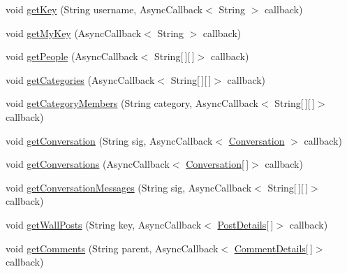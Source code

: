 \begin{DoxyCompactItemize}
\item 
void \hyperlink{interfaceballmerpeak_1_1turtlenet_1_1client_1_1TurtlenetAsync_a24536111eeed3b221288938fe085fc4d}{get\-Key} (String username, Async\-Callback$<$ String $>$ callback)
\item 
void \hyperlink{interfaceballmerpeak_1_1turtlenet_1_1client_1_1TurtlenetAsync_a5b01546855375c628581de60cb818bc1}{get\-My\-Key} (Async\-Callback$<$ String $>$ callback)
\item 
void \hyperlink{interfaceballmerpeak_1_1turtlenet_1_1client_1_1TurtlenetAsync_adb97f522403e5578f780b08e96e8f36b}{get\-People} (Async\-Callback$<$ String\mbox{[}$\,$\mbox{]}\mbox{[}$\,$\mbox{]}$>$ callback)
\item 
void \hyperlink{interfaceballmerpeak_1_1turtlenet_1_1client_1_1TurtlenetAsync_aaefb47d63b1bda3ce692fda9d4ff3b95}{get\-Categories} (Async\-Callback$<$ String\mbox{[}$\,$\mbox{]}\mbox{[}$\,$\mbox{]}$>$ callback)
\item 
void \hyperlink{interfaceballmerpeak_1_1turtlenet_1_1client_1_1TurtlenetAsync_a79c59f68c6b1293bb55ba7f7f07bf83a}{get\-Category\-Members} (String category, Async\-Callback$<$ String\mbox{[}$\,$\mbox{]}\mbox{[}$\,$\mbox{]}$>$ callback)
\item 
void \hyperlink{interfaceballmerpeak_1_1turtlenet_1_1client_1_1TurtlenetAsync_a2e727bd389829fcebaad120ee7900180}{get\-Conversation} (String sig, Async\-Callback$<$ \hyperlink{classballmerpeak_1_1turtlenet_1_1shared_1_1Conversation}{Conversation} $>$ callback)
\item 
void \hyperlink{interfaceballmerpeak_1_1turtlenet_1_1client_1_1TurtlenetAsync_a90857a2008d7e5029c53234d13a3eb29}{get\-Conversations} (Async\-Callback$<$ \hyperlink{classballmerpeak_1_1turtlenet_1_1shared_1_1Conversation}{Conversation}\mbox{[}$\,$\mbox{]}$>$ callback)
\item 
void \hyperlink{interfaceballmerpeak_1_1turtlenet_1_1client_1_1TurtlenetAsync_af3d8302be17123744f088078aca3c8f1}{get\-Conversation\-Messages} (String sig, Async\-Callback$<$ String\mbox{[}$\,$\mbox{]}\mbox{[}$\,$\mbox{]}$>$ callback)
\item 
void \hyperlink{interfaceballmerpeak_1_1turtlenet_1_1client_1_1TurtlenetAsync_a6abffb3c7b3f85f6601f3df9c6bb5af9}{get\-Wall\-Posts} (String key, Async\-Callback$<$ \hyperlink{classballmerpeak_1_1turtlenet_1_1shared_1_1PostDetails}{Post\-Details}\mbox{[}$\,$\mbox{]}$>$ callback)
\item 
void \hyperlink{interfaceballmerpeak_1_1turtlenet_1_1client_1_1TurtlenetAsync_a962d578b71c4bd469bd7e180c8c03ff9}{get\-Comments} (String parent, Async\-Callback$<$ \hyperlink{classballmerpeak_1_1turtlenet_1_1shared_1_1CommentDetails}{Comment\-Details}\mbox{[}$\,$\mbox{]}$>$ callback)

\end{DoxyCompactItemize}
